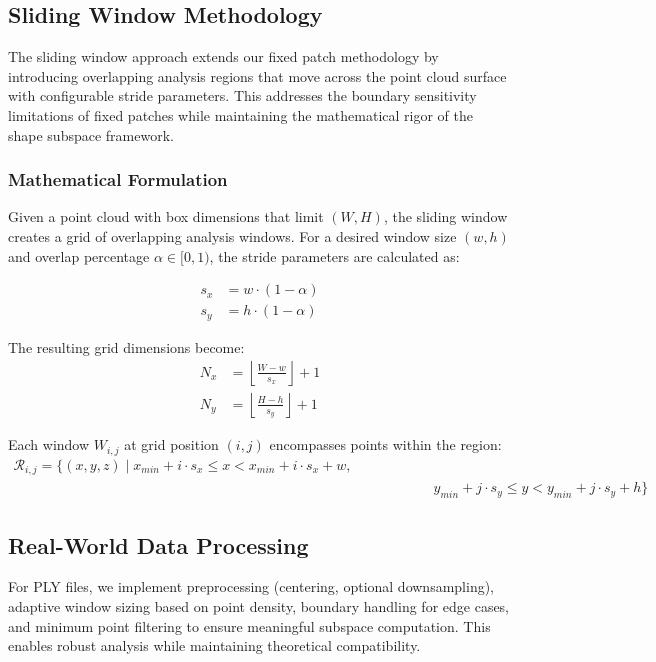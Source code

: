 \documentclass[../main.tex]{subfiles}
\begin{document}
\subsection{Sliding Window Methodology}

The sliding window approach extends our fixed patch methodology by introducing overlapping analysis regions that move across the point cloud surface with configurable stride parameters. This addresses the boundary sensitivity limitations of fixed patches while maintaining the mathematical rigor of the shape subspace framework.

\subsubsection{Mathematical Formulation}

Given a point cloud with box dimensions that limit $(W, H)$, the sliding window creates a grid of overlapping analysis windows. For a desired window size $(w, h)$ and overlap percentage $\alpha \in [0, 1)$, the stride parameters are calculated as:

\begin{align}
s_x &= w \cdot (1 - \alpha) \\
s_y &= h \cdot (1 - \alpha)
\end{align}

The resulting grid dimensions become:
\begin{align}
N_x &= \left\lfloor \frac{W - w}{s_x} \right\rfloor + 1 \\
N_y &= \left\lfloor \frac{H - h}{s_y} \right\rfloor + 1
\end{align}

Each window $W_{i,j}$ at grid position $(i, j)$ encompasses points within the region:
\begin{align}
\mathcal{R}_{i,j} = \{(x, y, z) \mid x_{min} + i \cdot s_x \leq x < x_{min} + i \cdot s_x + w, \\
& \qquad \qquad \quad y_{min} + j \cdot s_y \leq y < y_{min} + j \cdot s_y + h\}
\end{align}



\subsection{Real-World Data Processing}

For PLY files, we implement preprocessing (centering, optional downsampling), adaptive window sizing based on point density, boundary handling for edge cases, and minimum point filtering to ensure meaningful subspace computation. This enables robust analysis while maintaining theoretical compatibility.
\end{document}
